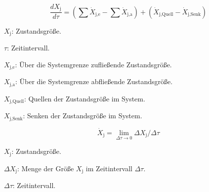 \begin{equation}
    \frac{dX_{\text{j}}}{d\tau} = (\sum \dot{X}_{\text{j,e}} - \sum \dot{X}_{\text{j,a}}) + (\dot{X}_{\text{j,Quell}} - \dot{X}_{\text{j,Senk}})
    \label{BilanzierungsgleichungAhrendt}
\end{equation}

\begin{description}
    \item \(X_{\text{j}}\): Zustandsgröße.
    \item \(\tau\): Zeitintervall.
    \item \(X_{\text{j,e}}\): Über die Systemgrenze zufließende Zustandsgröße.
    \item \(X_{\text{j,a}}\): Über die Systemgrenze abfließende Zustandsgröße.
    \item \(X_{\text{j,Quell}}\): Quellen der Zustandsgröße im System.
    \item \(X_{\text{j,Senk}}\): Senken der Zustandsgröße im System.
\end{description}


\begin{equation}
    \dot{X}_{\text{j}} = \lim_{\Delta\tau \to 0} \Delta X_{\text{j}}/ \Delta\tau
    \label{BilanzierungsgleichungAhrendtStrom}
\end{equation}

\begin{description}
    \item \(X_{\text{j}}\): Zustandsgröße.
    \item \(\Delta X_{\text{j}}\): Menge der Größe \(X_{\text{j}}\) im Zeitintervall \(\Delta \tau\).
    \item \(\Delta \tau\): Zeitintervall.
\end{description}


 

